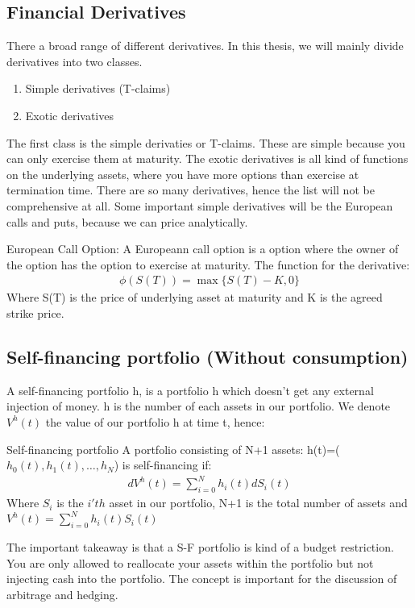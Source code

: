 \subsection{Financial Derivatives}
There a broad range of different derivatives. In this thesis, we will mainly divide derivatives into two classes. 
\begin{enumerate}
\item Simple derivatives (T-claims)
\item Exotic derivatives
\end{enumerate}
The first class is the simple derivaties or T-claims. These are simple because you can only exercise them at maturity. The exotic derivatives is all kind of functions on the underlying assets, where you have more options than exercise at termination time. There are so many derivatives, hence the list will not be comprehensive at all. Some important simple derivatives will be the European calls and puts, because we can price analytically.


\theoremstyle{definition}
\begin{definition}{European Call Option:}\label{ECall}
A Europeann call option is a option where the owner of the option has the option to exercise at maturity. The function for the derivative:
\begin{equation}
\begin{split}
\phi(S(T))=\max\{S(T)-K, 0\}
\end{split}
\end{equation}
Where S(T) is the price of underlying asset at maturity and K is the agreed strike price.
\end{definition}
\parencite{finKont}



\subsection{Self-financing portfolio (Without consumption)}
A self-financing portfolio h, is a portfolio h which doesn't get any external injection of money. h is the number of each assets in our portfolio. We denote $V^{h}(t)$ the value of our portfolio h at time t, hence:
\theoremstyle{definition}
\begin{definition}{Self-financing portfolio}
A portfolio consisting of N+1 assets: h(t)=($h_0(t),h_1(t), \dotsc, h_{N}$) is self-financing if:
\begin{equation}\label{SF}
\begin{split}
dV^{h}(t)=\sum_{i=0}^{N} h_{i}(t) dS_{i}(t)
\end{split}
\end{equation}
Where $S_{i}$ is the $i'th$ asset in our portfolio, N+1 is the total number of assets and\\
$V^{h}(t)=\sum_{i=0}^{N} h_{i}(t) S_{i}(t)$
\end{definition}
The important takeaway is that a S-F portfolio is kind of a budget restriction. You are only allowed to reallocate your assets within the portfolio but not injecting cash into the portfolio. The concept is important for the discussion of arbitrage and hedging.


